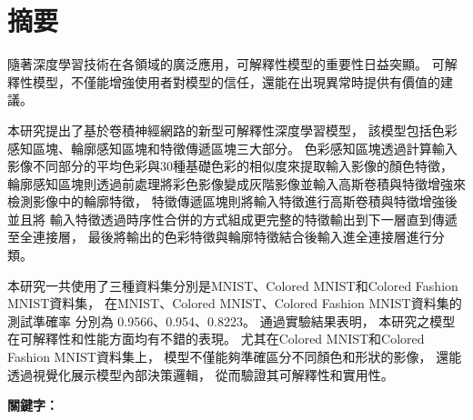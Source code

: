 \documentclass[class=NCU_thesis, crop=false]{standalone}
\begin{document}
\chapter{摘要}

隨著深度學習技術在各領域的廣泛應用，可解釋性模型的重要性日益突顯。
可解釋性模型，不僅能增強使用者對模型的信任，還能在出現異常時提供有價值的建議。

本研究提出了基於卷積神經網路的新型可解釋性深度學習模型，
該模型包括色彩感知區塊、輪廓感知區塊和特徵傳遞區塊三大部分。
色彩感知區塊透過計算輸入影像不同部分的平均色彩與30種基礎色彩的相似度來提取輸入影像的顏色特徵，
輪廓感知區塊則透過前處理將彩色影像變成灰階影像並輸入高斯卷積與特徵增強來檢測影像中的輪廓特徵，
特徵傳遞區塊則將輸入特徵進行高斯卷積與特徵增強後並且將
輸入特徵透過時序性合併的方式組成更完整的特徵輸出到下一層直到傳遞至全連接層，
最後將輸出的色彩特徵與輪廓特徵結合後輸入進全連接層進行分類。

本研究一共使用了三種資料集分別是MNIST、Colored MNIST和Colored Fashion MNIST資料集，
在MNIST、Colored MNIST、Colored Fashion MNIST資料集的測試準確率
分別為 0.9566、0.954、0.8223。
通過實驗結果表明，
本研究之模型在可解釋性和性能方面均有不錯的表現。
尤其在Colored MNIST和Colored Fashion MNIST資料集上，
模型不僅能夠準確區分不同顏色和形狀的影像，
還能透過視覺化展示模型內部決策邏輯，
從而驗證其可解釋性和實用性。

\vspace{2em}
\noindent \textbf{關鍵字：} \keywordsZh{} %
\end{document}
